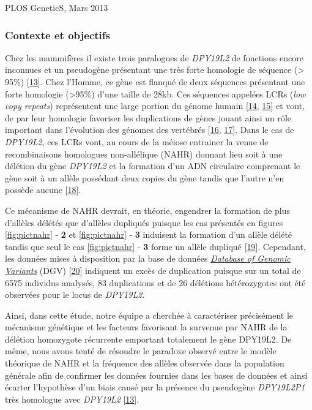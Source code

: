 \documentclass[12pt,twoside]{ugathesis}
\begin{document}
PLOS GeneticS, Mars 2013

\newpage

\subsubsection{Contexte et objectifs}\label{contexte-et-objectifs}

Chez les mammifères il existe trois paralogues de \emph{DPY19L2} de
fonctions encore inconnues et un pseudogène présentant une très forte
homologie de séquence (\textgreater{} 95\%)
{[}\protect\hyperlink{ref-Carson2006}{13}{]}. Chez l'Homme, ce gène est
flanqué de deux séquences présentant une forte homologie
(\textgreater{}95\%) d'une taille de 28kb. Ces séquences appelées LCRs
(\emph{low copy repeats}) représentent une large portion du génome
humain {[}\protect\hyperlink{ref-Cheung2003}{14},
\protect\hyperlink{ref-Bailey2002}{15}{]} et vont, de par leur homologie
favoriser les duplications de gènes jouant ainsi un rôle important dans
l'évolution des génomes des vertébrés
{[}\protect\hyperlink{ref-Walsh2003}{16},
\protect\hyperlink{ref-Ohno1970}{17}{]}. Dans le cas de \emph{DPY19L2},
ces LCRs vont, au cours de la méiose entrainer la venue de
recombinaisons homologues non-allélique (NAHR) donnant lieu soit à une
délétion du gène \emph{DPY19L2} et la formation d'un ADN circulaire
comprenant le gène soit à un allèle possédant deux copies du gène tandis
que l'autre n'en possède aucune
{[}\protect\hyperlink{ref-Harbuz2011a}{18}{]}.

Ce mécanisme de NAHR devrait, en théorie, engendrer la formation de plus
d'allèles délétés que d'allèles dupliqués puisque les cas présentés en
figures \ref{fig:pictnahr} - \textbf{2} et \ref{fig:pictnahr} -
\textbf{3} induisent la formation d'un allèle délété tandis que seul le
cas \ref{fig:pictnahr} - \textbf{3} forme un allèle dupliqué
{[}\protect\hyperlink{ref-Liu2012}{19}{]}. Cependant, les données mises
à disposition par la base de données
\href{http://dgv.tcag.ca/dgv/app/home}{\emph{Database of Genomic
Variants}} (DGV) {[}\protect\hyperlink{ref-MacDonald2014}{20}{]}
indiquent un excès de duplication puisque sur un total de 6575 individus
analysés, 83 duplications et de 26 délétions hétérozygotes ont été
observées pour le locus de \emph{DPY19L2}.

Ainsi, dans cette étude, notre équipe a cherchée à caractériser
précisément le mécanisme génétique et les facteurs favorisant la
survenue par NAHR de la délétion homozygote récurrente emportant
totalement le gène DPY19L2. De même, nous avons tenté de résoudre le
paradoxe observé entre le modèle théorique de NAHR et la fréquence des
allèles observée dans la population générale afin de confirmer les
données fournies dans les bases de données et ainsi écarter l'hypothèse
d'un biais causé par la présence du pseudogène \emph{DPY19L2P1} très
homologue avec \emph{DPY19L2}
{[}\protect\hyperlink{ref-Carson2006}{13}{]}.
\end{document}
